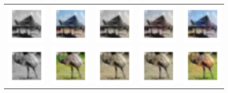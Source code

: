 \documentclass{article}
\begin{document}
\begin{table}[h!]
\begin{tabular}{ccccc}
    \includegraphics[width=2cm]{results3/179-bw.png} & \includegraphics[width=2cm]{results3/179-gt.png} & \includegraphics[width=2cm]{results5/179-relucnn.png} & \includegraphics[width=2cm]{results5/179-tanhcnn.png} & \includegraphics[width=2cm]{results3/179-gan.png} \\
    \includegraphics[width=2cm]{results3/219-bw.png} & \includegraphics[width=2cm]{results3/219-gt.png} & \includegraphics[width=2cm]{results5/219-relucnn.png} & \includegraphics[width=2cm]{results5/219-tanhcnn.png} & \includegraphics[width=2cm]{results3/219-gan.png} \\

\end{tabular}
\end{table}
\end{document}
